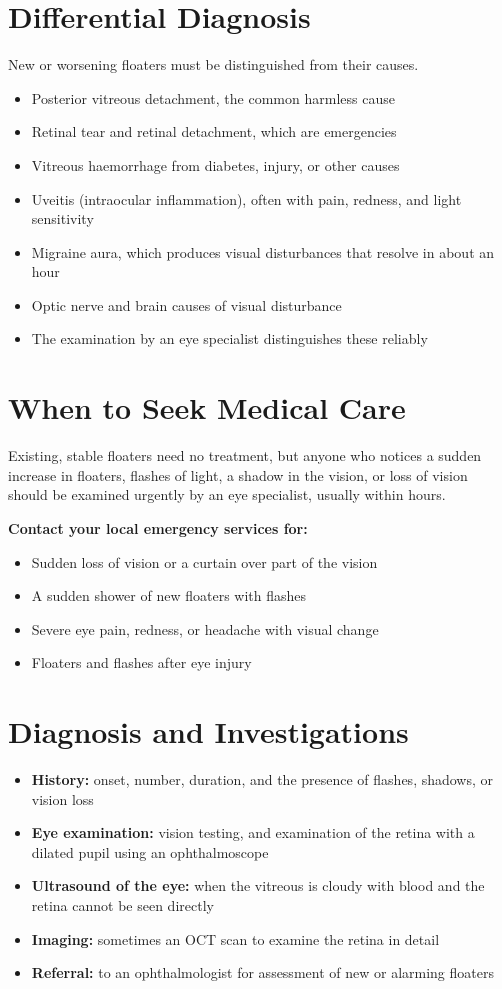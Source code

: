 \section*{Differential Diagnosis}
New or worsening floaters must be distinguished from their causes.
\begin{itemize}
    \item Posterior vitreous detachment, the common harmless cause
    \item Retinal tear and retinal detachment, which are emergencies
    \item Vitreous haemorrhage from diabetes, injury, or other causes
    \item Uveitis (intraocular inflammation), often with pain, redness, and light sensitivity
    \item Migraine aura, which produces visual disturbances that resolve in about an hour
    \item Optic nerve and brain causes of visual disturbance
    \item The examination by an eye specialist distinguishes these reliably
\end{itemize}

\section*{When to Seek Medical Care}
Existing, stable floaters need no treatment, but anyone who notices a sudden increase in floaters, flashes of light, a shadow in the vision, or loss of vision should be examined urgently by an eye specialist, usually within hours.

\textbf{Contact your local emergency services for:}
\begin{itemize}
    \item Sudden loss of vision or a curtain over part of the vision
    \item A sudden shower of new floaters with flashes
    \item Severe eye pain, redness, or headache with visual change
    \item Floaters and flashes after eye injury
\end{itemize}

\section*{Diagnosis and Investigations}
\begin{itemize}
    \item \textbf{History:} onset, number, duration, and the presence of flashes, shadows, or vision loss
    \item \textbf{Eye examination:} vision testing, and examination of the retina with a dilated pupil using an ophthalmoscope
    \item \textbf{Ultrasound of the eye:} when the vitreous is cloudy with blood and the retina cannot be seen directly
    \item \textbf{Imaging:} sometimes an OCT scan to examine the retina in detail
    \item \textbf{Referral:} to an ophthalmologist for assessment of new or alarming floaters
\end{itemize}

